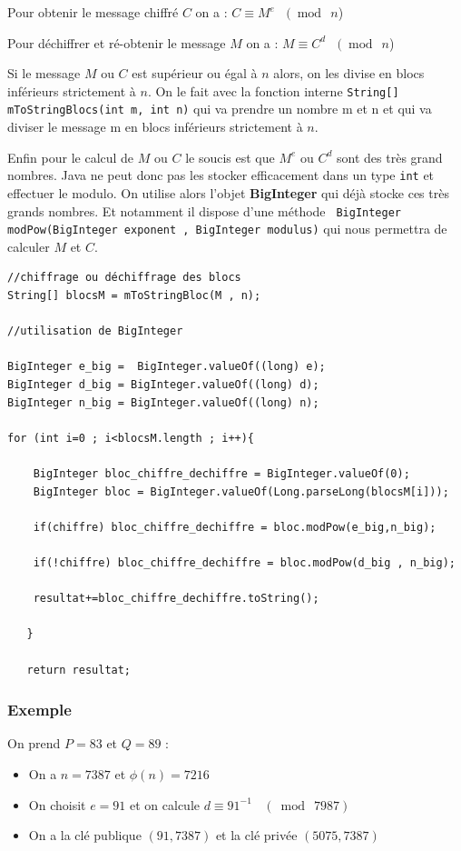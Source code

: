 \documentclass{article}
\begin{document}
Pour obtenir le message chiffré $C$ on a :
\(C \equiv M^e  \ \ \ \ (\bmod \ n\))

Pour déchiffrer et ré-obtenir le message $M$ on a :
\(M \equiv C^d  \ \ \ \	(\bmod \ n\))
\vspace{1\baselineskip}

Si le message $M$ ou $C$ est supérieur ou égal à $n$ alors, on les divise en blocs inférieurs strictement à $n$. On le fait avec la fonction interne \verb+String[] mToStringBlocs(int m, int n)+ qui va prendre un nombre m et n et qui va diviser le message m en blocs inférieurs strictement à $n$. 

Enfin pour le calcul de $M$ ou $C$ le soucis est que $M^e$ ou $C^d$ sont des très grand nombres. Java ne peut donc pas les stocker efficacement dans un type \verb+int+ et effectuer le modulo. On utilise alors l'objet \textbf{BigInteger} qui déjà stocke ces très grands nombres. Et notamment il dispose d'une méthode \verb+ BigInteger modPow(BigInteger exponent , BigInteger modulus)+ qui nous permettra de calculer $M$ et $C$.

\begin{verbatim}
//chiffrage ou déchiffrage des blocs
String[] blocsM = mToStringBloc(M , n);

//utilisation de BigInteger

BigInteger e_big =  BigInteger.valueOf((long) e);
BigInteger d_big = BigInteger.valueOf((long) d);
BigInteger n_big = BigInteger.valueOf((long) n);

for (int i=0 ; i<blocsM.length ; i++){

	BigInteger bloc_chiffre_dechiffre = BigInteger.valueOf(0);
    BigInteger bloc = BigInteger.valueOf(Long.parseLong(blocsM[i]));

    if(chiffre) bloc_chiffre_dechiffre = bloc.modPow(e_big,n_big);

    if(!chiffre) bloc_chiffre_dechiffre = bloc.modPow(d_big , n_big);

	resultat+=bloc_chiffre_dechiffre.toString();

   }

   return resultat;
\end{verbatim}


\subsubsection{Exemple}

On prend $P = 83$ et $Q=89$ : 
\begin{itemize}
\item On a $n = 7387$ et $\phi(n) = 7216$
\item On choisit $e = 91 $ et on calcule $ d \equiv 91^{-1} \ \ \ \ (\bmod \ 7987)$
\item On a la clé publique $(91 , 7387)$ et la clé privée $(5075 , 7387)$  
\end{itemize}
\vspace{1\baselineskip}
\end{document}

